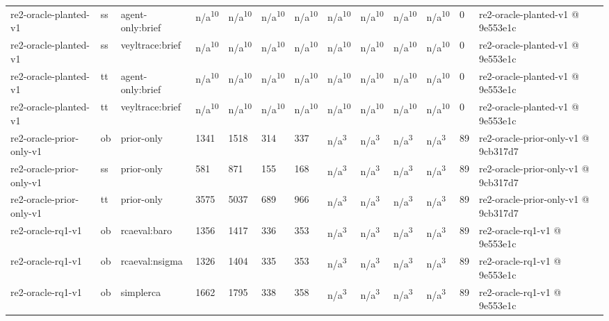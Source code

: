\begin{table}[t]
\begin{tabular}{lllllllllllll}
re2-oracle-planted-v1 & ss & agent-only:brief & n/a\textsuperscript{10} & n/a\textsuperscript{10} & n/a\textsuperscript{10} & n/a\textsuperscript{10} & n/a\textsuperscript{10} & n/a\textsuperscript{10} & n/a\textsuperscript{10} & n/a\textsuperscript{10} & 0 & re2-oracle-planted-v1 @ 9e553e1c \\
re2-oracle-planted-v1 & ss & veyltrace:brief & n/a\textsuperscript{10} & n/a\textsuperscript{10} & n/a\textsuperscript{10} & n/a\textsuperscript{10} & n/a\textsuperscript{10} & n/a\textsuperscript{10} & n/a\textsuperscript{10} & n/a\textsuperscript{10} & 0 & re2-oracle-planted-v1 @ 9e553e1c \\
re2-oracle-planted-v1 & tt & agent-only:brief & n/a\textsuperscript{10} & n/a\textsuperscript{10} & n/a\textsuperscript{10} & n/a\textsuperscript{10} & n/a\textsuperscript{10} & n/a\textsuperscript{10} & n/a\textsuperscript{10} & n/a\textsuperscript{10} & 0 & re2-oracle-planted-v1 @ 9e553e1c \\
re2-oracle-planted-v1 & tt & veyltrace:brief & n/a\textsuperscript{10} & n/a\textsuperscript{10} & n/a\textsuperscript{10} & n/a\textsuperscript{10} & n/a\textsuperscript{10} & n/a\textsuperscript{10} & n/a\textsuperscript{10} & n/a\textsuperscript{10} & 0 & re2-oracle-planted-v1 @ 9e553e1c \\
re2-oracle-prior-only-v1 & ob & prior-only & 1341 & 1518 & 314 & 337 & n/a\textsuperscript{3} & n/a\textsuperscript{3} & n/a\textsuperscript{3} & n/a\textsuperscript{3} & 89 & re2-oracle-prior-only-v1 @ 9cb317d7 \\
re2-oracle-prior-only-v1 & ss & prior-only & 581 & 871 & 155 & 168 & n/a\textsuperscript{3} & n/a\textsuperscript{3} & n/a\textsuperscript{3} & n/a\textsuperscript{3} & 89 & re2-oracle-prior-only-v1 @ 9cb317d7 \\
re2-oracle-prior-only-v1 & tt & prior-only & 3575 & 5037 & 689 & 966 & n/a\textsuperscript{3} & n/a\textsuperscript{3} & n/a\textsuperscript{3} & n/a\textsuperscript{3} & 89 & re2-oracle-prior-only-v1 @ 9cb317d7 \\
re2-oracle-rq1-v1 & ob & rcaeval:baro & 1356 & 1417 & 336 & 353 & n/a\textsuperscript{3} & n/a\textsuperscript{3} & n/a\textsuperscript{3} & n/a\textsuperscript{3} & 89 & re2-oracle-rq1-v1 @ 9e553e1c \\
re2-oracle-rq1-v1 & ob & rcaeval:nsigma & 1326 & 1404 & 335 & 353 & n/a\textsuperscript{3} & n/a\textsuperscript{3} & n/a\textsuperscript{3} & n/a\textsuperscript{3} & 89 & re2-oracle-rq1-v1 @ 9e553e1c \\
re2-oracle-rq1-v1 & ob & simplerca & 1662 & 1795 & 338 & 358 & n/a\textsuperscript{3} & n/a\textsuperscript{3} & n/a\textsuperscript{3} & n/a\textsuperscript{3} & 89 & re2-oracle-rq1-v1 @ 9e553e1c \\

\end{tabular}
\end{table}
